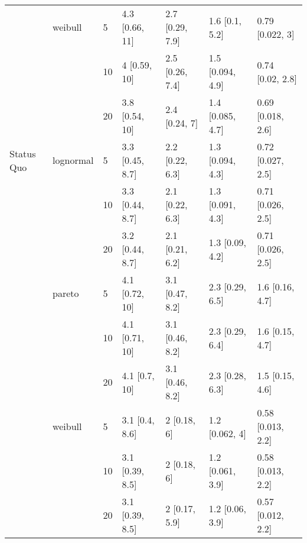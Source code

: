 \begin{tabular}{lllllll}
           & weibull & 5  &   4.3 [0.66, 11] &   2.7 [0.29, 7.9] &     1.6 [0.1, 5.2] &     0.79 [0.022, 3] \\
           &         & 10 &     4 [0.59, 10] &   2.5 [0.26, 7.4] &   1.5 [0.094, 4.9] &    0.74 [0.02, 2.8] \\
           &         & 20 &   3.8 [0.54, 10] &     2.4 [0.24, 7] &   1.4 [0.085, 4.7] &   0.69 [0.018, 2.6] \\
Status Quo & lognormal & 5  &  3.3 [0.45, 8.7] &   2.2 [0.22, 6.3] &   1.3 [0.094, 4.3] &   0.72 [0.027, 2.5] \\
           &         & 10 &  3.3 [0.44, 8.7] &   2.1 [0.22, 6.3] &   1.3 [0.091, 4.3] &   0.71 [0.026, 2.5] \\
           &         & 20 &  3.2 [0.44, 8.7] &   2.1 [0.21, 6.2] &    1.3 [0.09, 4.2] &   0.71 [0.026, 2.5] \\
           & pareto & 5  &   4.1 [0.72, 10] &   3.1 [0.47, 8.2] &    2.3 [0.29, 6.5] &     1.6 [0.16, 4.7] \\
           &         & 10 &   4.1 [0.71, 10] &   3.1 [0.46, 8.2] &    2.3 [0.29, 6.4] &     1.6 [0.15, 4.7] \\
           &         & 20 &    4.1 [0.7, 10] &   3.1 [0.46, 8.2] &    2.3 [0.28, 6.3] &     1.5 [0.15, 4.6] \\
           & weibull & 5  &   3.1 [0.4, 8.6] &       2 [0.18, 6] &     1.2 [0.062, 4] &   0.58 [0.013, 2.2] \\
           &         & 10 &  3.1 [0.39, 8.5] &       2 [0.18, 6] &   1.2 [0.061, 3.9] &   0.58 [0.013, 2.2] \\
           &         & 20 &  3.1 [0.39, 8.5] &     2 [0.17, 5.9] &    1.2 [0.06, 3.9] &   0.57 [0.012, 2.2] \\
\bottomrule
\end{tabular}
